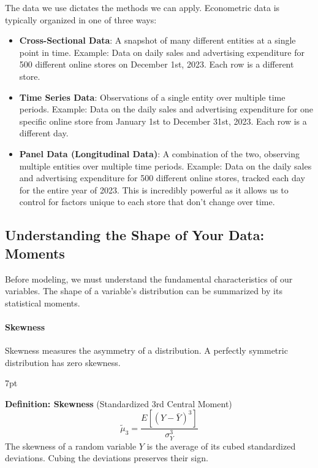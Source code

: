 \documentclass{article}
\newenvironment{greenblock}{%
\def\FrameCommand{%
  \hspace{1pt}%
    {\color{Green}%
    \vrule width 2pt}%
    {\color{greenshade}%
    \vrule width 4pt}%
  \colorbox{greenshade}%
}%
\MakeFramed{%
  \advance%
  \hsize-%
  \width%
  \FrameRestore}%
\noindent\hspace{-4.55pt}%
\begin{adjustwidth}{}{7pt}%
\vspace{2pt}\vspace{2pt}%
}
{%
\vspace{2pt}\end{adjustwidth}\endMakeFramed%
}
\begin{document}
The data we use dictates the methods we can apply. Econometric data is typically organized in one of three ways:

\begin{itemize}
  \item \textbf{Cross-Sectional Data}: A snapshot of many different entities at a single point in time.
  Example: Data on daily sales and advertising expenditure for 500 different online stores on December 1st, 2023. Each row is a different store.

  \item \textbf{Time Series Data}: Observations of a single entity over multiple time periods.
  Example: Data on the daily sales and advertising expenditure for one specific online store from January 1st to December 31st, 2023. Each row is a different day.

  \item \textbf{Panel Data (Longitudinal Data)}: A combination of the two, observing multiple entities over multiple time periods.
  Example: Data on the daily sales and advertising expenditure for 500 different online stores, tracked each day for the entire year of 2023. This is incredibly powerful as it allows us to control for factors unique to each store that don't change over time.
\end{itemize}



\subsection{Understanding the Shape of Your Data: Moments} %
\label{sub:understanding_the_shape_of_your_data_moments}




Before modeling, we must understand the fundamental characteristics of our variables. The shape of a variable's distribution can be summarized by its statistical moments.

\paragraph{Skewness}

Skewness measures the asymmetry of a distribution. A perfectly symmetric distribution has zero skewness.

\begin{greenblock}
\textbf{Definition: Skewness} (Standardized 3rd Central Moment)
\begin{equation}
\tilde \mu_3=\frac{E[(Y-\bar Y)^3]}{\sigma^3_Y}
\end{equation}
The skewness of a random variable $Y$ is the average of its cubed standardized deviations. Cubing the deviations preserves their sign.
\end{greenblock}
\end{document}

